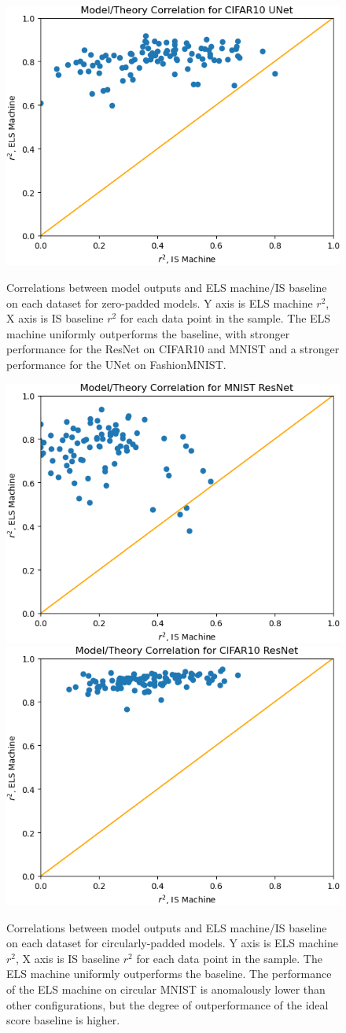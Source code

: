 \documentclass{article}
\theoremstyle{plain}
\theoremstyle{definition}
\theoremstyle{remark}
\begin{document}
\begin{figure}
    \includegraphics[width=0.4\linewidth]{scatter_cifar10_zeros_corrs_unet_m.png}\\

    \caption{Correlations between model outputs and ELS machine/IS baseline on each dataset for zero-padded models. Y axis is ELS machine $r^2$, X axis is IS baseline $r^2$ for each data point in the sample. The ELS machine uniformly outperforms the baseline, with stronger performance for the ResNet on CIFAR10 and MNIST and a stronger performance for the UNet on FashionMNIST.}
    \label{fig:a1}
\end{figure}

\begin{figure}
    \centering
    \includegraphics[width=0.4\linewidth]{scatter_mnist_circular_corrs_resnet_m.png}
    \includegraphics[width=0.4\linewidth]{scatter_cifar10_circular_corrs_resnet_m.png}

    \caption{Correlations between model outputs and ELS machine/IS baseline on each dataset for circularly-padded models. Y axis is ELS machine $r^2$, X axis is IS baseline $r^2$ for each data point in the sample. The ELS machine uniformly outperforms the baseline. The performance of the ELS machine on circular MNIST is anomalously lower than other configurations, but the degree of outperformance of the ideal score baseline is higher.}
    \label{fig:a2}
\end{figure}
\end{document}
